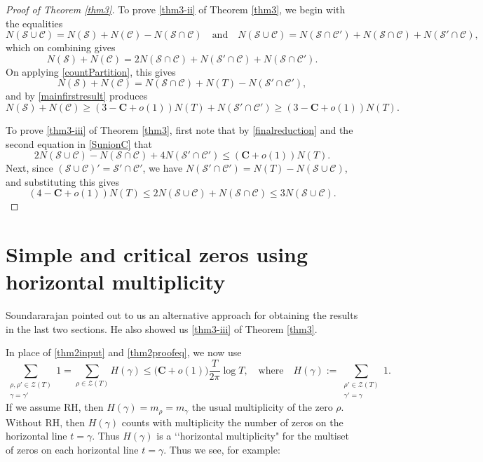 \documentclass[11pt]{amsart}
\theoremstyle{remark}
\theoremstyle{plain}
\numberwithin{equation}{section}
\begin{document}
\begin{proof}[Proof of Theorem \ref{thm3}]
To prove \ref{thm3-ii} of Theorem \ref{thm3}, we begin with the equalities
\begin{equation}\label{SunionC} N(\mathcal{S}\cup\mathcal{C}) = N(\mathcal{S}) +N(\mathcal{C}) - N(\mathcal{S}\cap\mathcal{C}) \quad \text{and} \quad N(\mathcal{S}\cup\mathcal{C}) = N(\mathcal{S}\cap\mathcal{C'}) +N(\mathcal{S}\cap\mathcal{C})+N(\mathcal{S'}\cap\mathcal{C}) ,\end{equation}
which on combining gives 
\[ N(\mathcal{S}) + N(\mathcal{C}) = 2N(\mathcal{S}\cap\mathcal{C})+N(\mathcal{S'}\cap\mathcal{C})+N(\mathcal{S}\cap\mathcal{C'}) .\]
On applying \eqref{countPartition}, this gives
\[ N(\mathcal{S}) + N(\mathcal{C}) = N(\mathcal{S}\cap\mathcal{C}) + N(T) - N(\mathcal{S'}\cap\mathcal{C'}), \]
and by \eqref{mainfirstresult} produces
\[ N(\mathcal{S}) + N(\mathcal{C}) \ge (3-\mathbf{C}+o(1)) N(T) + N(\mathcal{S'}\cap\mathcal{C'}) \ge (3-\mathbf{C}+o(1)) N(T).\]

To prove \ref{thm3-iii} of Theorem \ref{thm3}, first note that by \eqref{finalreduction} and the second equation in \eqref{SunionC} that 
\[ 2N(\mathcal{S}\cup\mathcal{C})-N(\mathcal{S}\cap\mathcal{C}) + 4N(\mathcal{S'}\cap\mathcal{C'})\le (\mathbf{C}+o(1))N(T).\]
Next, since $(\mathcal{S}\cup\mathcal{C})' = \mathcal{S'}\cap\mathcal{C'}$, we have $N( \mathcal{S'}\cap\mathcal{C'})= N(T)-N(\mathcal{S}\cup\mathcal{C})$, and substituting this gives 
\[ (4 -\mathbf{C}+o(1) )N(T) \le 2N(\mathcal{S}\cup\mathcal{C}) + N(\mathcal{S}\cap\mathcal{C})\le 3N(\mathcal{S}\cup\mathcal{C}).\]

\end{proof}


\section{Simple and critical zeros using horizontal multiplicity}

Soundararajan pointed out to us an alternative approach for obtaining the results in the last two sections. He also showed us \ref{thm3-iii} of Theorem \ref{thm3}.

In place of \eqref{thm2input} and \eqref{thm2proofeq}, we now use
\begin{equation} \label{Hmult1}
\sum_{\substack{\rho,\rho' \in \mathcal{Z}(T) \\ \gamma=\gamma'}} 1 = \sum_{\rho \in \mathcal{Z}(T)}H(\gamma) \le \Big(\mathbf{C}+o(1)\Big) \frac{T}{2\pi}\log{T},
\quad \text{where} \quad
H(\gamma) := \sum_{\substack{\rho' \in \mathcal{Z}(T)\\ \gamma'=\gamma}} 1.
\end{equation}
If we assume RH, then $H(\gamma) = m_\rho = m_\gamma$ the usual multiplicity of the zero $\rho$. Without RH, then $H(\gamma)$ counts with multiplicity the number of zeros on the horizontal line $t=\gamma$. Thus $H(\gamma)$ is a \lq \lq horizontal multiplicity" for the multiset of zeros on each horizontal line $t=\gamma$. Thus we see, for example:
\end{document}
